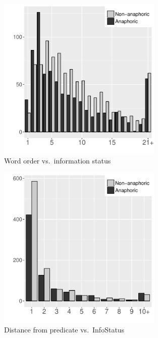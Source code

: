 \begin{figure}
	\begin{center}
	\includegraphics[width=0.7\textwidth]{figure/DEPositionIS.pdf}
	\caption{Word order vs.\ information status}
	\label{DEPositionISF2}
	\end{center}
\end{figure}
\begin{figure}
	\begin{center}
	\includegraphics[width=0.7\textwidth]{figure/DiffInfoStatus.pdf}
	\caption{Distance from predicate vs.\ InfoStatus}
	\label{DiffInfoStatusF2}
	\end{center}
\end{figure}


